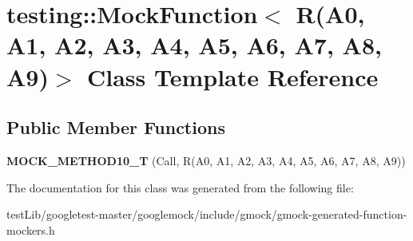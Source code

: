 \hypertarget{classtesting_1_1MockFunction_3_01R_07A0_00_01A1_00_01A2_00_01A3_00_01A4_00_01A5_00_01A6_00_01A7_00_01A8_00_01A9_08_4}{}\section{testing\+:\+:Mock\+Function$<$ R(A0, A1, A2, A3, A4, A5, A6, A7, A8, A9)$>$ Class Template Reference}
\label{classtesting_1_1MockFunction_3_01R_07A0_00_01A1_00_01A2_00_01A3_00_01A4_00_01A5_00_01A6_00_01A7_00_01A8_00_01A9_08_4}
\subsection*{Public Member Functions}
\begin{DoxyCompactItemize}
\item 
\mbox{\label{classtesting_1_1MockFunction_3_01R_07A0_00_01A1_00_01A2_00_01A3_00_01A4_00_01A5_00_01A6_00_01A7_00_01A8_00_01A9_08_4_adb493fcbb4936734eda9cf99b4d0acd0}} 
{\bfseries M\+O\+C\+K\+\_\+\+M\+E\+T\+H\+O\+D10\+\_\+T} (Call, R(A0, A1, A2, A3, A4, A5, A6, A7, A8, A9))
\end{DoxyCompactItemize}


The documentation for this class was generated from the following file\+:\begin{DoxyCompactItemize}
\item 
test\+Lib/googletest-\/master/googlemock/include/gmock/gmock-\/generated-\/function-\/mockers.\+h\end{DoxyCompactItemize}
